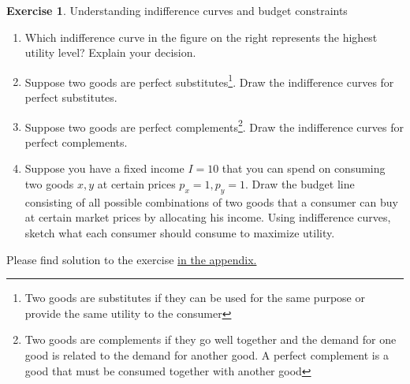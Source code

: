 \documentclass[
  12pt,
  oneside]{book}
\providecommand{\tightlist}{%
  \setlength{\itemsep}{0pt}\setlength{\parskip}{0pt}}
\theoremstyle{definition}
\theoremstyle{definition}
\theoremstyle{definition}
\newtheorem{exercise}{Exercise}[chapter]
\theoremstyle{definition}
\theoremstyle{remark}
\begin{document}
\begin{exercise}
\protect\hypertarget{exr:Uic}{}\label{exr:Uic}Understanding indifference curves and budget constraints

\begin{enumerate}
\def\labelenumi{\alph{enumi})}
\tightlist
\item
  Which indifference curve in the figure on the right represents the highest utility level? Explain your decision.
\item
  Suppose two goods are perfect substitutes\footnote{Two goods are substitutes if they can be used for the same purpose or provide the same utility to the consumer}. Draw the indifference curves for perfect substitutes.
\item
  Suppose two goods are perfect complements\footnote{Two goods are complements if they go well together and the demand for one good is related to the demand for another good. A perfect complement is a good that must be consumed together with another good}. Draw the indifference curves for perfect complements.
\item
  Suppose you have a fixed income \(I=10\) that you can spend on consuming two goods \(x, y\) at certain prices \(p_x=1, p_y=1\). Draw the budget line consisting of all possible combinations of two goods that a consumer can buy at certain market prices by allocating his income. Using indifference curves, sketch what each consumer should consume to maximize utility.
\end{enumerate}

Please find solution to the exercise \protect\hyperlink{sol:Uic}{in the appendix.}
\end{exercise}
\end{document}
